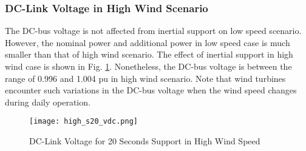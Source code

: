 \subsubsection{DC-Link Voltage in High Wind Scenario}
The DC-bus voltage is not affected from inertial support on low speed scenario. However, the nominal power and additional power in low speed case is much smaller than that of high wind scenario. The effect of inertial support in high wind case is shown in Fig. \ref{high_s20_vdc}. Nonetheless, the DC-bus voltage is between the range of 0.996 and 1.004 pu in high wind scenario. Note that wind turbines encounter such variations in the DC-bus voltage when the wind speed changes during daily operation. 
\begin{figure}[h!]
	\centering
	\texttt{[image: high\_s20\_vdc.png]}
	\caption{DC-Link Voltage for 20 Seconds Support in High Wind Speed}
	\label{high_s20_vdc}
\end{figure}
